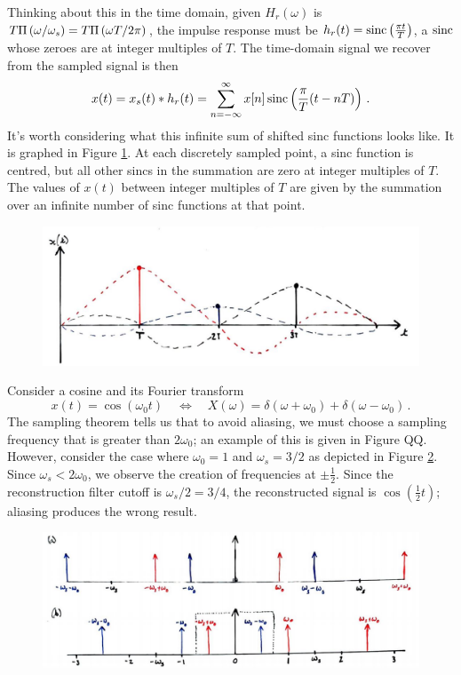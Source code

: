 Thinking about this in the time domain, given $H_r(\omega)$ is
$T\Pi\left(\omega/\omega_s\right) = T\Pi\left(\omega T/2\pi\right)$, the impulse response
must be $h_r(t) = \operatorname{sinc}\left(\frac{\pi t}{T}\right)$, a $\operatorname{sinc}$ whose zeroes
are at integer multiples of $T$. The time-domain signal we recover from the sampled
signal is then
%
\begin{displaymath}
  x(t) = x_s(t)*h_r(t) = \sum_{n=-\infty}^\infty x[n]\operatorname{sinc}\left(\frac{\pi}{T}(t - nT)\right) \,.
\end{displaymath}
%
It's worth considering what this infinite sum of shifted sinc functions looks
like. It is graphed in Figure \ref{fig::lecture_13_sincs}.
At each discretely sampled point, a sinc
function is centred, but all other sincs in the summation are zero at integer
multiples of $T$. The values of $x(t)$ between integer multiples of $T$ are
given by the summation over an infinite number of sinc functions at that point.
%
\begin{figure}[H]
  \includegraphics[width=\textwidth]{images/lecture_13_sincs.JPG}
  \caption{
  }
  \label{fig::lecture_13_sincs}
\end{figure}
%
\begin{exmp}
  Consider a cosine and its Fourier transform
  \begin{displaymath}
    x(t) = \cos(\omega_0 t) \quad\Longleftrightarrow\quad
    X(\omega) = \delta(\omega+\omega_0) + \delta(\omega-\omega_0) \,.
  \end{displaymath}
  The sampling theorem tells us that to avoid aliasing, we must choose
  a sampling frequency that is greater than $2\omega_0$; an example of this
  is given in Figure QQ. However, consider the case where $\omega_0=1$ and
  $\omega_s = 3/2$ as depicted in Figure \ref{fig::lecture_13_aliasing_cosine}.
  Since $\omega_s < 2\omega_0$, we observe the creation of frequencies at
  $\pm\frac{1}{2}$. Since the reconstruction filter cutoff is
  $\omega_s/2 = 3/4$, the reconstructed signal is $\cos(\frac{1}{2}t)$; aliasing
  produces the wrong result.
  \begin{figure}[H]
    \includegraphics[width=\textwidth]{images/lecture_13_aliasing_cosine.JPG}
    \caption{
    }
    \label{fig::lecture_13_aliasing_cosine}
  \end{figure}
\end{exmp}
